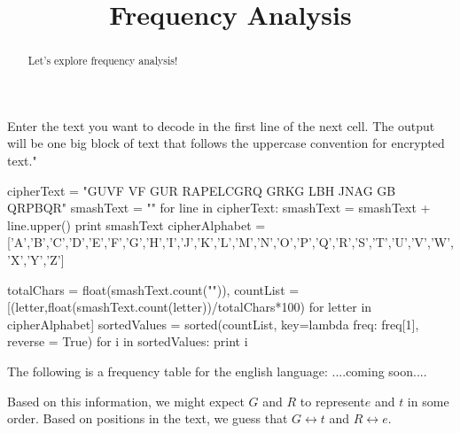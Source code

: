 \documentclass[handout]{ximera}
\title{Frequency Analysis}
\begin{document}
\begin{abstract}{Let's explore frequency analysis!}\end{abstract}


Enter the text you want to decode in the first line of the next cell.  The output will be one big block of text that follows the uppercase convention for encrypted text."

\begin{python}
cipherText = "GUVF VF GUR RAPELCGRQ GRKG LBH JNAG GB QRPBQR"
smashText =  ""
for line in cipherText:
	smashText = smashText + line.upper()
     	print smashText
cipherAlphabet = ['A','B','C','D','E','F','G','H','I','J','K','L','M','N','O','P','Q','R','S','T','U','V','W','X','Y','Z']

totalChars = float(smashText.count("")),
countList = [(letter,float(smashText.count(letter))/totalChars*100) for letter in cipherAlphabet]
sortedValues = sorted(countList, key=lambda freq: freq[1], reverse = True)
for i in sortedValues:
	print i
\end{python}

The following is a frequency table for the english language: ....coming soon....


Based on this information, we might expect $G$ and $R$ to represent$ e$ and $t$ in some order.  Based on positions in the text, we guess that $G \leftrightarrow t$ and $R \leftrightarrow e$.
\end{document}

